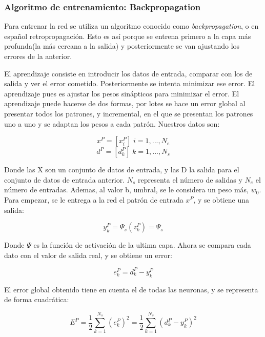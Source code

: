 \documentclass[12pt]{article}
\numberwithin{equation}{section}
\begin{document}
\subsubsection{Algoritmo de entrenamiento: Backpropagation}
Para entrenar la red se utiliza un algoritmo conocido como \textit{backpropagation}, o en español retropropagación. Esto es así porque se entrena primero a la capa más profunda(la más cercana a la salida) y posteriormente se van ajustando los errores de la anterior.

El aprendizaje consiste en introducir los datos de entrada, comparar con los de salida y ver el error cometido. Posteriormente se intenta minimizar ese error. El aprendizaje pues es ajustar los pesos sinápticos para minimizar el error. El aprendizaje puede hacerse de dos formas, por lotes se hace un error global al presentar todos los patrones, y incremental, en el que se presentan los patrones uno a uno	y se adaptan los pesos a cada patrón. Nuestros datos son:

\begin{equation}
x^P = [x_i^P] \; i= 1,..., N_e
\end{equation}
\begin{equation}
d^P = [d_k^P] \; k=1,...,N_s
\end{equation}

Donde las X son un conjunto de datos de entrada, y las D la salida para el conjunto de datos de entrada anterior. $N_s$ representa el número de salidas y $N_e$ el número de entradas. Ademas, al valor b, umbral, se le considera un peso más, $w_0$. Para empezar, se le entrega a la red el patrón de entrada $x^P$, y se obtiene una salida:

\begin{equation}
y_k^P=\Psi _s(z^P_k)=\Psi _s
\end{equation}

Donde $\Psi$ es la función de activación de la ultima capa. Ahora se compara cada dato con el valor de salida real, y se obtiene un error:

\begin{equation}
e^P_k=d_k^P-y_k^P
\end{equation}

El error global obtenido tiene en cuenta el de todas las neuronas, y se representa de forma cuadrática:

\begin{equation}
E^P = \frac{1}{2} \sum_{k=1}^{N_s} (e_k^P)^2=\frac{1}{2}\sum_{k=1}^{N_s}(d_k^P-y_k^P)^2
\end{equation}
\end{document}
